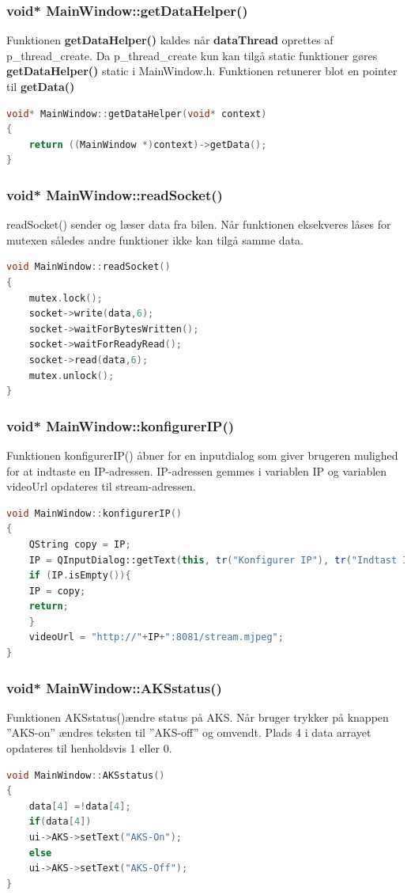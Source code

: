 \subsubsection{void* MainWindow::getDataHelper()}
Funktionen \textbf{getDataHelper()} kaldes når \textbf{dataThread} oprettes af p\_thread\_create. Da p\_thread\_create kun kan tilgå static funktioner gøres \textbf{getDataHelper()} static i MainWindow.h. Funktionen retunerer blot en pointer til \textbf{getData()}
\begin{lstlisting}[caption={getDataHelper},label=lst:getData, language=c++]
void* MainWindow::getDataHelper(void* context)
{
    return ((MainWindow *)context)->getData();
}
\end{lstlisting}

\subsubsection{void* MainWindow::readSocket()}
readSocket() sender og læser data fra bilen. Når funktionen eksekveres låses for mutexen således andre funktioner ikke kan tilgå samme data.
\begin{lstlisting}[caption={readSocket},label=lst:readSocket, language=c++]
void MainWindow::readSocket()
{   
    mutex.lock();
    socket->write(data,6);
    socket->waitForBytesWritten();
    socket->waitForReadyRead();
    socket->read(data,6);
    mutex.unlock();
}
\end{lstlisting}

\subsubsection{void* MainWindow::konfigurerIP()}
Funktionen konfigurerIP() åbner for en inputdialog som giver brugeren mulighed for at indtaste en IP-adressen. IP-adressen gemmes i variablen IP og variablen videoUrl opdateres til stream-adressen.
\begin{lstlisting}[caption={konfigurerIP},label=lst:konfigurerIP, language=c++]
void MainWindow::konfigurerIP()
{
    QString copy = IP;
    IP = QInputDialog::getText(this, tr("Konfigurer IP"), tr("Indtast IP adressen"), QLineEdit::Normal,IP);
    if (IP.isEmpty()){
    IP = copy;
    return;
    }
    videoUrl = "http://"+IP+":8081/stream.mjpeg";
}
\end{lstlisting}

\subsubsection{void* MainWindow::AKSstatus()}
Funktionen AKSstatus()ændre status på AKS. Når bruger trykker på knappen ''AKS-on'' ændres teksten til ''AKS-off'' og omvendt. Plads 4 i data arrayet opdateres til henholdsvis 1 eller 0. 
\begin{lstlisting}[caption={AKSstatus},label=lst:AKSstatus, language=c++]
void MainWindow::AKSstatus()
{
    data[4] =!data[4];
    if(data[4])
    ui->AKS->setText("AKS-On");
    else
    ui->AKS->setText("AKS-Off");
}
\end{lstlisting}

